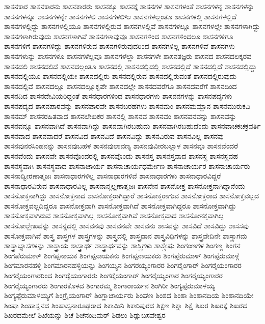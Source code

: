 {ಶಾಸನಕಾರ
ಶಾಸನಕಾರನು
ಶಾಸನಕಾರರು
ಶಾಸನಕ್ಕೂ
ಶಾಸನಕ್ಕೆ
ಶಾಸನಗಳ
ಶಾಸನಗಳಂತೆ
ಶಾಸನಗಳನ್ನ
ಶಾಸನಗಳನ್ನು
ಶಾಸನಗಳನ್ನೂ
ಶಾಸನಗಳನ್ನೇ
ಶಾಸನಗಳಲಿ
ಶಾಸನಗಳಲಿ್ಲ
ಶಾಸನಗಳಲ್ಲಂತೂ
ಶಾಸನಗಳಲ್ಲಿ
ಶಾಸನಗಳಲ್ಲಿದೆ
ಶಾಸನಗಳಲ್ಲಿದ್ದು
ಶಾಸನಗಳಲ್ಲಿಯೂ
ಶಾಸನಗಳಲ್ಲಿರುವ
ಶಾಸನಗಳಲ್ಲಿವೆ
ಶಾಸನಗಳಲ್ಲೂ
ಶಾಸನಗಳಲ್ಲೇ
ಶಾಸನಗಳಾಗಿದ್ದು
ಶಾಸನಗಳಾಗಿರುವುದು
ಶಾಸನಗಳಾಗಿವೆ
ಶಾಸನಗಳಾವುವೂ
ಶಾಸನಗಳಿಂದ
ಶಾಸನಗಳಿಂದಲೂ
ಶಾಸನಗಳಿಗೂ
ಶಾಸನಗಳಿಗೆ
ಶಾಸನಗಳಿದ್ದು
ಶಾಸನಗಳಿರುವ
ಶಾಸನಗಳಿರುವುದರಿಂದ
ಶಾಸನಗಳಿಲ್ಲ
ಶಾಸನಗಳಿವೆ
ಶಾಸನಗಳು
ಶಾಸನಗಳುನ್ನು
ಶಾಸನಗಳೂ
ಶಾಸನಗಳೆಲ್ಲವೂ
ಶಾಸನಗಳೆಲ್ಲಾ
ಶಾಸನಗಳೇ
ಶಾಸನತಜ್ಞರು
ಶಾಸನದ
ಶಾಸನದಲಕ್ಕರವ
ಶಾಸನದಲಿ
ಶಾಸನದಲಿದೆ
ಶಾಸನದಲ್ಲಂತೂ
ಶಾಸನದಲ್ಲಿ
ಶಾಸನದಲ್ಲಿದಲ್ಲಿ
ಶಾಸನದಲ್ಲಿದೆ
ಶಾಸನದಲ್ಲಿದೆೆ
ಶಾಸನದಲ್ಲಿದ್ದು
ಶಾಸನದಲ್ಲಿಯೂ
ಶಾಸನದಲ್ಲಿಯೇ
ಶಾಸನದಲ್ಲಿರು
ಶಾಸನದಲ್ಲಿರುವ
ಶಾಸನದಲ್ಲಿರುವಂತೆ
ಶಾಸನದಲ್ಲಿರುವುದು
ಶಾಸನದಲ್ಲಿವೆ
ಶಾಸನದಲ್ಲೂ
ಶಾಸನದಲ್ಲೂಕೃಪೇ
ಶಾಸನದಲ್ಲೇ
ಶಾಸನದವರೆಗೂ
ಶಾಸನದವರೆಗೆ
ಶಾಸನದಿಂದ
ಶಾಸನದಿದ
ಶಾಸನದೇವಿಯರಿದ್ದಂತೆ
ಶಾಸನಧಾರಗಳಿಂದ
ಶಾಸನಧಾರಗಳು
ಶಾಸನನಗಳನ್ನು
ಶಾಸನಪದ್ಯಗಳು
ಶಾಸನಪದ್ಯದ
ಶಾಸನಪಾಠವನ್ನು
ಶಾಸನಪಾಠವೇ
ಶಾಸನಬರಹಗಳು
ಶಾಸನಮಂ
ಶಾಸನಮಮ್ಲಾನ
ಶಾಸನಮುರುಕವಿ
ಶಾಸನಮ್
ಶಾಸನರಹಿತವಾದ
ಶಾಸನಲೇಖಕರ
ಶಾಸನಲ್ಲಿ
ಶಾಸನವ
ಶಾಸನವಂ
ಶಾಸನವನವನ್ನು
ಶಾಸನವನ್ನು
ಶಾಸನವನ್ನೂ
ಶಾಸನವಾಗಿದೆ
ಶಾಸನವಾಗಿದ್ದು
ಶಾಸನವಾಗಿರಬಹುದು
ಶಾಸನವಾಗಿರಬಹುದೆಂದು
ಶಾಸನವಾಚಕಚಕ್ರವರ್ತಿ
ಶಾಸನವಾದ
ಶಾಸನವಾದರೆ
ಶಾಸನವಿದ
ಶಾಸನವಿದೆ
ಶಾಸನವಿದ್ದು
ಶಾಸನವಿರುವ
ಶಾಸನವಿಲ್ಲ
ಶಾಸನವು
ಶಾಸನವುನರಸಿಂಹನನ್ನು
ಶಾಸನವುಬಹಳ
ಶಾಸನವುಲಾವಣ್ಯ
ಶಾಸನವುವೀರಬಲ್ಲಾಳ
ಶಾಸನವೂ
ಶಾಸನವೆಂದರೆ
ಶಾಸನವೆಂದು
ಶಾಸನವೇ
ಶಾಸನವೊಂದರಲ್ಲಿ
ಶಾಸನವೊಂದು
ಶಾಸನಸ್ತ
ಶಾಸನಸ್ತವಾದ
ಶಾಸನಸ್ಥ
ಶಾಸನಸ್ಥವಹ
ಶಾಸನಸ್ಥವಾಗಿ
ಶಾಸನಸ್ಥವಾದ
ಶಾಸನಾಚಾರ್ಯ
ಶಾಸನಾಚಾರ್ಯಧರ್ಮೇಣ
ಶಾಸನಾಚಾರ್ಯರ
ಶಾಸನಾಚಾರ್ಯರು
ಶಾಸನಾದ್ವೀರಣಾತ್ಮಜಃ
ಶಾಸನಾಧಾರಗಳಿಲ್ಲ
ಶಾಸನಾಧಾರಗಳಿವೆ
ಶಾಸನಾಧಾರಗಳು
ಶಾಸನಾಧಾರವಿದ್ದರೆ
ಶಾಸನಾಧಾರವಿರುವ
ಶಾಸನಾಧಾರವಿಲ್ಲ
ಶಾಸನಾನ್ಮಲ್ಲಣಾತ್ಮಜಃ
ಶಾಸನೇನ
ಶಾಸನೋಕ್ತ
ಶಾಸನೋಕ್ತನಾಗಿದ್ದಾನೆಂದು
ಶಾಸನೋಕ್ತನಾಗಿದ್ದು
ಶಾಸನೋಕ್ತನಾದ
ಶಾಸನೋಕ್ತರಾಗಿದ್ದಾರೆ
ಶಾಸನೋಕ್ತರಾಗುವ
ಶಾಸನೋಕ್ತರಾದ
ಶಾಸನೋಕ್ತವಲ್ಲದ
ಶಾಸನೋಕ್ತವಲ್ಲದಿದ್ದರೂ
ಶಾಸನೋಕ್ತವಾಗಿ
ಶಾಸನೋಕ್ತವಾಗಿದೆ
ಶಾಸನೋಕ್ತವಾಗಿದ್ದರೂ
ಶಾಸನೋಕ್ತವಾಗಿದ್ದು
ಶಾಸನೋಕ್ತವಾಗಿರುವ
ಶಾಸನೋಕ್ತವಾಗಿಲ್ಲ
ಶಾಸನೋಕ್ತವಾಗಿವೆ
ಶಾಸನೋಕ್ತವಾದ
ಶಾಸನೋನಕ್ತವಾಗಿಲ್ಲ
ಶಾಸನೋಲ್ಲೇಖವನ್ನು
ಶಾಸನ್ದದಲ್ಲಿ
ಶಾಸವನವು
ಶಾಸವನವೇ
ಶಾಸವನು
ಶಾಸವನ್ನು
ಶಾಸವಿದೆ
ಶಾಸವಿದ್ದು
ಶಾಸಸವು
ಶಾಸೋಕ್ತವಾಗಿವೆ
ಶಾಸ್ತ್ರ
ಶಾಸ್ತ್ರಗಳ
ಶಾಸ್ತ್ರಗಳನ್ನು
ಶಾಸ್ತ್ರದಲ್ಲಿ
ಶಾಸ್ತ್ರದಾನ
ಶಾಸ್ತ್ರವಿಧಿಗಳನ್ನು
ಶಾಸ್ತ್ರವೇದಿನೇ
ಶಾಸ್ತ್ರಾಗಮ
ಶಾಸ್ತ್ರಾಭ್ಯಾಸಗಳನ್ನು
ಶಾಸ್ತ್ರಾಯ
ಶಾಸ್ತ್ರಾರ್ಥ
ಶಾಸ್ತ್ರಾರ್ಥವನ್ನು
ಶಾಸ್ತ್ರಿಗಳು
ಶಾಸ್ತ್ರೇಷು
ಶಿಂಗಂಣಗಳ
ಶಿಂಗಣ್ಣ
ಶಿಂಗನ
ಶಿಂಗಪೆರುಮಾಳ್
ಶಿಂಗಪ್ಪನಾಯಕ
ಶಿಂಗಪ್ಪನಾಯಕನು
ಶಿಂಗಪ್ಪನಾಯಕರು
ಶಿಂಗಪ್ಪೆರುಮಾಳ್
ಶಿಂಗಪ್ಪೆರುಮಾಳ್ಗೆ
ಶಿಂಗಮಾರನಹಳ್ಳಿ
ಶಿಂಗಮಾರನಹಳ್ಳಿಯನ್ನು
ಶಿಂಗಯ್ಯನ
ಶಿಂಗರಯ್ಯಂಗಾರರ
ಶಿಂಗರೈಂಗಾರ್
ಶಿಂಗರೈಯಂಗಾರರ
ಶಿಂಗರೈಯಂಗಾರರಿಂದ
ಶಿಂಗರೈಯಂಗಾರರು
ಶಿಂಗರೈಯಂಗಾರ್
ಶಿಂಗರೈಯ್ಯಂಗಾರ
ಶಿಂಗರೈಯ್ಯಂಗಾರರ
ಶಿಂಗರೈಯ್ಯಂಗಾರರು
ಶಿಂಗಾರಕೊಳದ
ಶಿಂಗಾರಮ್ಮ
ಶಿಂಗಾರಾರ್ಯನ
ಶಿಂಗಿರೀ
ಶಿಂಗ್ಯಪ್ಪೆರುಮಾಳಯ್ಯ
ಶಿಂಗ್ಯಪ್ಪೆರುಮಾಳಯ್ಯಗೆ
ಶಿಂಗ್ರೈಯಂಗಾರ್
ಶಿಂಗ್ಲಾಚಾರ್ಯರು
ಶಿಂಘಣ
ಶಿಂಶದ
ಶಿಂಶಾ
ಶಿಂಶಾನದಿಯ
ಶಿಂಶಾನದಿಯೇ
ಶಿಂಷಾ
ಶಿಂಹಾಸ್ವನದ
ಶಿಂಹಾಸ್ವನಾರೂಢರಾದ
ಶಿಕಾಮಿನಿ
ಶಿಕಾರಿಪುರದ
ಶಿಕ್ಷಣ
ಶಿಕ್ಷಾ
ಶಿಕ್ಷೆ
ಶಿಖರ
ಶಿಖರಕ್ಕೆ
ಶಿಖರದ
ಶಿಖರದಮೇಲೆ
ಶಿಖೆಯನ್ನು
ಶಿಚೆ
ಶಿಚೆನಂದಿಮಠ್
ಶಿಡಲು
ಶಿಡ್ಲುಬಸವೇಶ್ವರ
}
